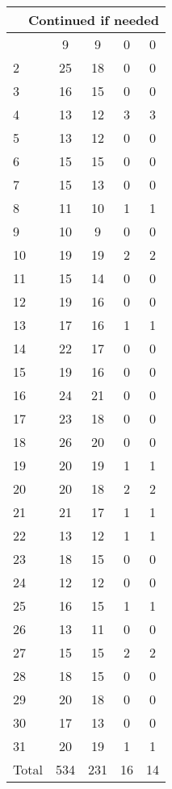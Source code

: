\begin{center}
\begin{longtable}{l|c|c|c|c}
\hline \multicolumn{5}{|r|}{{Continued if needed}} \\ \hline
\endfoot 
1 & 9 & 9 & 0 & 0\\ \hline
2 & 25 & 18 & 0 & 0\\ \hline
3 & 16 & 15 & 0 & 0\\ \hline
4 & 13 & 12 & 3 & 3\\ \hline
5 & 13 & 12 & 0 & 0\\ \hline
6 & 15 & 15 & 0 & 0\\ \hline
7 & 15 & 13 & 0 & 0\\ \hline
8 & 11 & 10 & 1 & 1\\ \hline
9 & 10 & 9 & 0 & 0\\ \hline
10 & 19 & 19 & 2 & 2\\ \hline
11 & 15 & 14 & 0 & 0\\ \hline
12 & 19 & 16 & 0 & 0\\ \hline
13 & 17 & 16 & 1 & 1\\ \hline
14 & 22 & 17 & 0 & 0\\ \hline
15 & 19 & 16 & 0 & 0\\ \hline
16 & 24 & 21 & 0 & 0\\ \hline
17 & 23 & 18 & 0 & 0\\ \hline
18 & 26 & 20 & 0 & 0\\ \hline
19 & 20 & 19 & 1 & 1\\ \hline
20 & 20 & 18 & 2 & 2\\ \hline
21 & 21 & 17 & 1 & 1\\ \hline
22 & 13 & 12 & 1 & 1\\ \hline
23 & 18 & 15 & 0 & 0\\ \hline
24 & 12 & 12 & 0 & 0\\ \hline
25 & 16 & 15 & 1 & 1\\ \hline
26 & 13 & 11 & 0 & 0\\ \hline
27 & 15 & 15 & 2 & 2\\ \hline
28 & 18 & 15 & 0 & 0\\ \hline
29 & 20 & 18 & 0 & 0\\ \hline
30 & 17 & 13 & 0 & 0\\ \hline
31 & 20 & 19 & 1 & 1\\ \hline
\hline \hline
Total & 534 & 231 & 16 & 14



\end{longtable}
\end{center}

 
